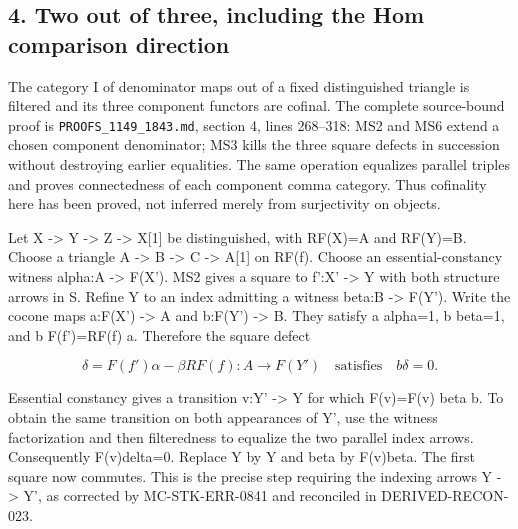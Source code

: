 \subsection{\texorpdfstring{4. Two out of three,\allowbreak{} including the Hom comparison direction}{4. Two out of  including the Hom comparison direction}}\label{proofs-4166-5089-two-out-of-three-including-the-hom-comparison-direction}

The category I of denominator maps out of a fixed distinguished triangle is filtered and its three component functors are cofinal. The complete source-bound proof is \texttt{PROOFS\_\allowbreak{}1149\_\allowbreak{}1843.\allowbreak{}md},\allowbreak{} section 4,\allowbreak{} lines 268–\allowbreak{}318:\allowbreak{} MS2 and MS6 extend a chosen component denominator; MS3 kills the three square defects in succession without destroying earlier equalities. The same operation equalizes parallel triples and proves connectedness of each component comma category. Thus cofinality here has been proved,\allowbreak{} not inferred merely from surjectivity on objects.

Let X \allowbreak{}-> Y \allowbreak{}-> Z \allowbreak{}-> X[1]\allowbreak{} be distinguished,\allowbreak{} with RF(X)\allowbreak{}\allowbreak{}=A and RF(Y)\allowbreak{}\allowbreak{}=B. Choose a triangle A \allowbreak{}-> B \allowbreak{}-> C \allowbreak{}-> A[1]\allowbreak{} on RF(f)\allowbreak{}. Choose an essential-constancy witness alpha:\allowbreak{}A \allowbreak{}-> F(X')\allowbreak{}. MS2 gives a square to f':\allowbreak{}X' \allowbreak{}-> Y\textquotesingle{} with both structure arrows in S. Refine Y\textquotesingle{} to an index admitting a witness beta:\allowbreak{}B \allowbreak{}-> F(Y')\allowbreak{}. Write the cocone maps a:\allowbreak{}F(X')\allowbreak{} \allowbreak{}-> A and b:\allowbreak{}F(Y')\allowbreak{} \allowbreak{}-> B. They satisfy a alpha\allowbreak{}=1,\allowbreak{} b beta\allowbreak{}=1,\allowbreak{} and b F(f')\allowbreak{}\allowbreak{}=RF(f)\allowbreak{} a. Therefore the square defect

\[
 \delta=F(f')\alpha-\beta RF(f):A\longrightarrow F(Y')
 \quad\text{satisfies}\quad b\delta=0.
\]

Essential constancy gives a transition v:\allowbreak{}Y' \allowbreak{}-> Y\textquotesingle\textquotesingle{} for which F(v)\allowbreak{}\allowbreak{}=F(v)\allowbreak{} beta b. To obtain the same transition on both appearances of Y',\allowbreak{} use the witness factorization and then filteredness to equalize the two parallel index arrows. Consequently F(v)\allowbreak{}delta\allowbreak{}=0. Replace Y\textquotesingle{} by Y\textquotesingle\textquotesingle{} and beta by F(v)\allowbreak{}beta. The first square now commutes. This is the precise step requiring the indexing arrows Y \allowbreak{}-> Y',\allowbreak{} as corrected by MC-STK-ERR-0841 and reconciled in DERIVED-RECON-023.

